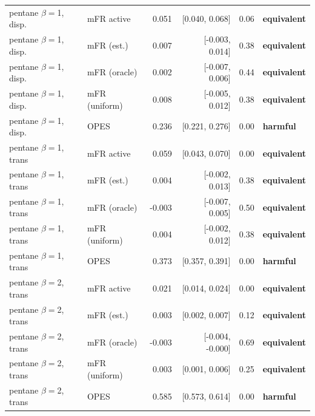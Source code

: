 \begin{table}[t]
\begin{tabular}{llrrrl}
pentane $\beta{=}$1, disp. & mFR active & 0.051 & [0.040, 0.068] & 0.06 & \textbf{equivalent} \\
pentane $\beta{=}$1, disp. & mFR (est.) & 0.007 & [-0.003, 0.014] & 0.38 & \textbf{equivalent} \\
pentane $\beta{=}$1, disp. & mFR (oracle) & 0.002 & [-0.007, 0.006] & 0.44 & \textbf{equivalent} \\
pentane $\beta{=}$1, disp. & mFR (uniform) & 0.008 & [-0.005, 0.012] & 0.38 & \textbf{equivalent} \\
pentane $\beta{=}$1, disp. & OPES & 0.236 & [0.221, 0.276] & 0.00 & \textbf{harmful} \\
pentane $\beta{=}$1, trans & mFR active & 0.059 & [0.043, 0.070] & 0.00 & \textbf{equivalent} \\
pentane $\beta{=}$1, trans & mFR (est.) & 0.004 & [-0.002, 0.013] & 0.38 & \textbf{equivalent} \\
pentane $\beta{=}$1, trans & mFR (oracle) & -0.003 & [-0.007, 0.005] & 0.50 & \textbf{equivalent} \\
pentane $\beta{=}$1, trans & mFR (uniform) & 0.004 & [-0.002, 0.012] & 0.38 & \textbf{equivalent} \\
pentane $\beta{=}$1, trans & OPES & 0.373 & [0.357, 0.391] & 0.00 & \textbf{harmful} \\
pentane $\beta{=}$2, trans & mFR active & 0.021 & [0.014, 0.024] & 0.00 & \textbf{equivalent} \\
pentane $\beta{=}$2, trans & mFR (est.) & 0.003 & [0.002, 0.007] & 0.12 & \textbf{equivalent} \\
pentane $\beta{=}$2, trans & mFR (oracle) & -0.003 & [-0.004, -0.000] & 0.69 & \textbf{equivalent} \\
pentane $\beta{=}$2, trans & mFR (uniform) & 0.003 & [0.001, 0.006] & 0.25 & \textbf{equivalent} \\
pentane $\beta{=}$2, trans & OPES & 0.585 & [0.573, 0.614] & 0.00 & \textbf{harmful} \\
\bottomrule\end{tabular}\end{table}
